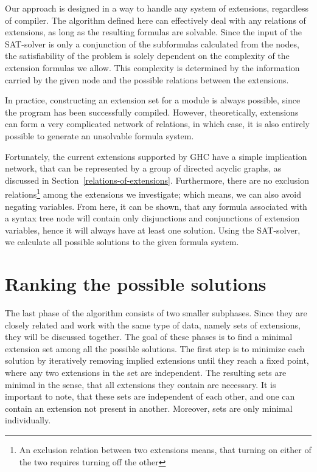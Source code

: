 \documentclass[main.tex]{subfiles}
\begin{document}
	Our approach is designed in a way to handle any system of extensions, regardless of compiler. The algorithm defined here can effectively deal with any relations of extensions, as long as the resulting formulas are solvable. Since the input of the SAT-solver is only a conjunction of the subformulas calculated from the nodes, the satisfiability of the problem is solely dependent on the complexity of the extension formulas we allow. This complexity is determined by the information carried by the given node and the possible relations between the extensions.
	
	In practice, constructing an extension set for a module is always possible, since the program has been successfully compiled. However, theoretically, extensions can form a very complicated network of relations, in which case, it is also entirely possible to generate an unsolvable formula system. %
	
	Fortunately, the current extensions supported by GHC have a simple implication network, that can be represented by a group of directed acyclic graphs, as discussed in Section~\ref{relations-of-extensions}. Furthermore, there are no exclusion relations\footnote{An exclusion relation between two extensions means, that turning on either of the two requires turning off the other} among the extensions we investigate; which means, we can also avoid negating variables. From here, it can be shown, that any formula associated with a syntax tree node will contain only disjunctions and conjunctions of extension variables, hence it will always have at least one solution. Using the SAT-solver, we calculate all possible solutions to the given formula system.
	
	\section{Ranking the possible solutions} \label{ranking-solutions}
	
	The last phase of the algorithm consists of two smaller subphases. Since they are closely related and work with the same type of data, namely sets of extensions, they will be discussed together.	The goal of these phases is to find a minimal extension set among all the possible solutions. The first step is to minimize each solution by iteratively removing implied extensions until they reach a fixed point, where any two extensions in the set are independent. The resulting sets are minimal in the sense, that all extensions they contain are necessary. It is important to note, that these sets are independent of each other, and one can contain an extension not present in another. Moreover, sets are only minimal individually. 
	
\end{document}
